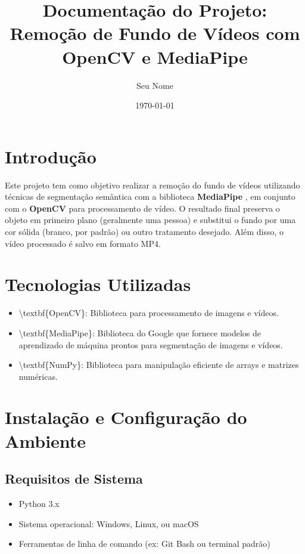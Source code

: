 \documentclass{article}%
\title{Documentação do Projeto: Remoção de Fundo de Vídeos com OpenCV e MediaPipe}%
\author{Seu Nome}%
\date{\today}%
\begin{document}
%
\normalsize%
\maketitle%
\section{Introdução}%
\label{sec:Introduo}%
Este projeto tem como objetivo realizar a remoção do fundo de vídeos utilizando técnicas de segmentação semântica com a biblioteca %
\textbf{MediaPipe}%
, em conjunto com o %
\textbf{OpenCV}%
 para processamento de vídeo. O resultado final preserva o objeto em primeiro plano (geralmente uma pessoa) e substitui o fundo por uma cor sólida (branco, por padrão) ou outro tratamento desejado. Além disso, o vídeo processado é salvo em formato MP4.

%
\section{Tecnologias Utilizadas}%
\label{sec:TecnologiasUtilizadas}%
\begin{itemize}%
\item%
\textbackslash{}textbf\{OpenCV\}: Biblioteca para processamento de imagens e vídeos.%
\item%
\textbackslash{}textbf\{MediaPipe\}: Biblioteca do Google que fornece modelos de aprendizado de máquina prontos para segmentação de imagens e vídeos.%
\item%
\textbackslash{}textbf\{NumPy\}: Biblioteca para manipulação eficiente de arrays e matrizes numéricas.%
\end{itemize}

%
\section{Instalação e Configuração do Ambiente}%
\label{sec:InstalaoeConfiguraodoAmbiente}%
\subsection{Requisitos de Sistema}%
\label{subsec:RequisitosdeSistema}%
\begin{itemize}%
\item%
Python 3.x%
\item%
Sistema operacional: Windows, Linux, ou macOS%
\item%
Ferramentas de linha de comando (ex: Git Bash ou terminal padrão)%
\end{itemize}
\end{document}
